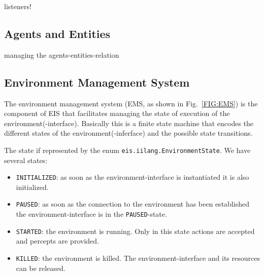 \documentclass[a4]{article}
\newcommand{\EIS}{\textsf{EIS}\xspace}
\begin{document}
listeners!

\subsection{Agents and Entities}

managing the agents-entities-relation

\subsection{Environment Management System}

The environment management system (EMS, as shown in Fig.~\ref{FIG:EMS}) is the component of \EIS that facilitates managing the
state of execution of the environment(-interface). Basically this is a finite state machine that encodes the different
states of the environment(-inferface) and the possible state transitions.

The state if represented by the enum \texttt{eis.iilang.EnvironmentState}.
We have several states:
\begin{itemize}
\item\texttt{INITIALIZED}: 
as soon as the environment-interface is instantiated it is also initialized. 
\item\texttt{PAUSED}: as soon as the connection to the environment has been
established the environment-interface is in the \texttt{PAUSED}-state.
\item\texttt{STARTED}: the environment is running. Only in this state actions are accepted and 
percepts are provided. 
\item\texttt{KILLED}: the environment is killed. The environment-interface  and its resources can be released.
\end{itemize}
\end{document}
